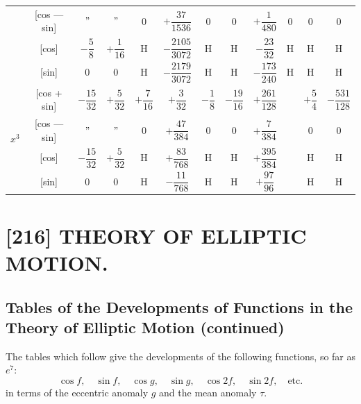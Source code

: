 \documentclass[11pt,a4paper]{book}
\begin{document}
{{\begin{center}
\begin{tabular}{|c|c|c|c|c|c|c|c|c|c|c|c|}
& [cos --- sin] & $"$ & $"$ & $0$ & $+\dfrac{37}{1536}$ & $0$ & $0$ & $+\dfrac{1}{480}$ & $0$ & $0$ & $0$ \\
& [cos] & $-\dfrac{5}{8}$ & $+\dfrac{1}{16}$ & H & $-\dfrac{2105}{3072}$ & H & H & $-\dfrac{23}{32}$ & H & H & H \\
& [sin] & $0$ & $0$ & H & $-\dfrac{2179}{3072}$ & H & H & $-\dfrac{173}{240}$ & H & H & H \\
\hline
\multirow{4}{*}{$x^3$} & [cos + sin] & $-\dfrac{15}{32}$ & $+\dfrac{5}{32}$ & $+\dfrac{7}{16}$ & $+\dfrac{3}{32}$ & $-\dfrac{1}{8}$ & $-\dfrac{19}{16}$ & $+\dfrac{261}{128}$ & & $+\dfrac{5}{4}$ & $-\dfrac{531}{128}$ \\
& [cos --- sin] & $"$ & $"$ & $0$ & $+\dfrac{47}{384}$ & $0$ & $0$ & $+\dfrac{7}{384}$ & & $0$ & $0$ \\
& [cos] & $-\dfrac{15}{32}$ & $+\dfrac{5}{32}$ & H & $+\dfrac{83}{768}$ & H & H & $+\dfrac{395}{384}$ & & H & H \\
& [sin] & $0$ & $0$ & H & $-\dfrac{11}{768}$ & H & H & $+\dfrac{97}{96}$ & & H & H \\
\hline
\end{tabular}
\end{center}

\newpage
\clearpage



\section*{[216] THEORY OF ELLIPTIC MOTION.}

\subsection*{Tables of the Developments of Functions in the Theory of Elliptic Motion (continued)}

The tables which follow give the developments of the following functions, so far as $e^7$:
\[
\cos f, \quad \sin f, \quad \cos g, \quad \sin g, \quad \cos 2f, \quad \sin 2f, \quad \text{etc.}
\]
in terms of the eccentric anomaly $g$ and the mean anomaly $\tau$.

}}
\end{document}
